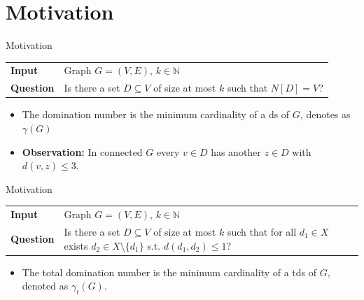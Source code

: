 \section{Motivation}
\begin{frame}[c]{Motivation}
\begin{tcolorbox}[colback=TUMBlueLighter,title=\dom]
    \begin{tabularx}{1.0\textwidth}{>{\hsize=0.30\hsize}X>{\hsize=0.8\hsize}X}
        \textbf{Input} & Graph $G = (V, E)$, $k \in \mathbb{N}$\\
        \textbf{Question} & Is there a set {$D \subseteq V$} of size at most $k$ such that ${N[D] = V}$? \\
    \end{tabularx}
\end{tcolorbox}

\begin{itemize}
\item The domination number is the minimum cardinality of a ds of $G$, denotes as $\gamma(G)$
\item \textbf{Observation:} In connected $G$ every $v\in D$ has another $z \in D$ with $d(v,z) \leq 3$.
\end{itemize}

\end{frame}

\begin{frame}[c]{Motivation}
\begin{tcolorbox}[colback=TUMBlueLighter,title=\tdom]
    \begin{tabularx}{1.0\textwidth}{>{\hsize=0.30\hsize}X>{\hsize=0.8\hsize}X}
        \textbf{Input} & Graph $G = (V, E)$, $k \in \mathbb{N}$\\
        \textbf{Question} & Is there a set $D \subseteq V$ of size at most $k$ such that for all $d_1 \in X$ exists $d_2 \in X \setminus \{d_1\}$ s.t. ${d(d_1, d_2) \leq 1}$? \\
    \end{tabularx}
\end{tcolorbox}

\begin{itemize}
    \item The total domination number is the minimum cardinality of a tds of $G$, denoted as $\gamma_t(G)$.
\end{itemize}

\end{frame}

